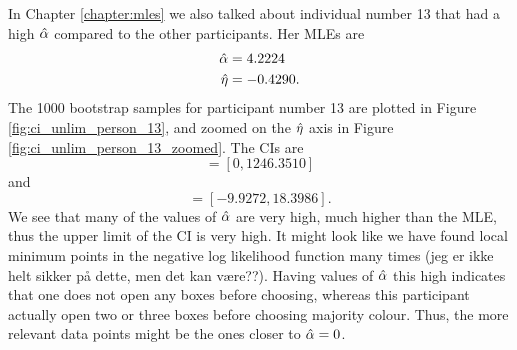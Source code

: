 In Chapter \ref{chapter:mles} we also talked about individual number 13 that had a high $\hat{\alpha}$ compared to the other participants. Her MLEs are
\begin{equation*}
    \begin{aligned}
        \hat{\alpha} &= 4.2224\\
        \hat{\eta} &= -0.4290.
    \end{aligned}
\end{equation*}
The 1000 bootstrap samples for participant number 13 are plotted in Figure \ref{fig:ci_unlim_person_13}, and zoomed on the $\hat{\eta}$ axis in Figure \ref{fig:ci_unlim_person_13_zoomed}. The CIs are
\begin{equation*}
    [\hat{\alpha}^{*(5)}_{1000},\hat{\alpha}^{*(95)}_{1000}] = [0,1246.3510]
\end{equation*}
and
\begin{equation*}
    [\hat{\eta}^{*(5)}_{1000},\hat{\eta}^{*(95)}_{1000}] = [-9.9272,18.3986].
\end{equation*}
We see that many of the values of $\hat{\alpha}$ are very high, much higher than the MLE, thus the upper limit of the CI is very high.  It might look like we have found local minimum points in the negative log likelihood function many times (jeg er ikke helt sikker på dette, men det kan være??). Having values of $\hat{\alpha}$ this high indicates that one does not open any boxes before choosing, whereas this participant actually open two or three boxes before choosing majority colour. Thus, the more relevant data points might be the ones closer to $\hat{\alpha}=0$. 

